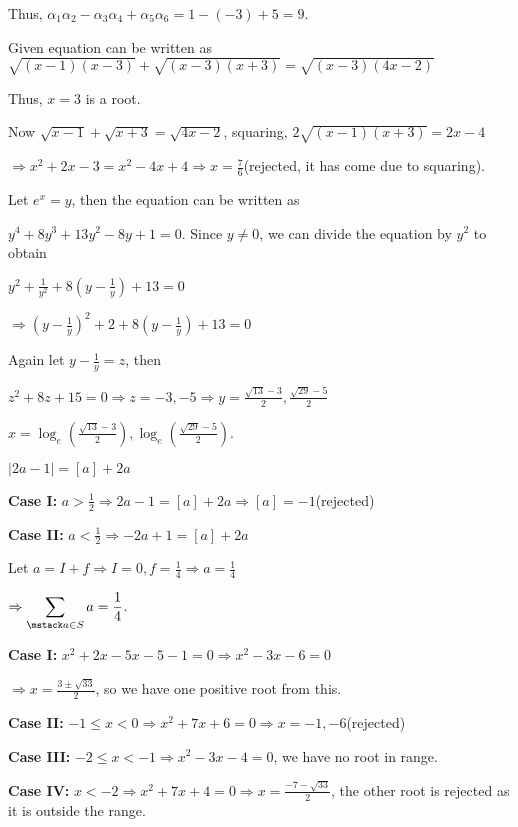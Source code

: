   Thus, $\alpha_1\alpha_2 - \alpha_3\alpha_4 + \alpha_5\alpha_6 = 1 - (-3) + 5 = 9$.
\item Given equation can be written as $\sqrt{(x - 1)(x - 3)} + \sqrt{(x - 3)(x + 3)} = \sqrt{(x - 3)(4x -
  2)}$

  Thus, $x = 3$ is a root.

  Now $\sqrt{x - 1} + \sqrt{x + 3} = \sqrt{4x - 2}$, squaring, $2\sqrt{(x - 1)(x + 3)} = 2x - 4$

  $\Rightarrow x^2 + 2x - 3 = x^2 - 4x + 4 \Rightarrow x = \frac{7}{6}$(rejected, it has come due to
  squaring).
\item Let $e^x = y$, then the equation can be written as

  $y^4 + 8y^3 + 13y^2 - 8y + 1 = 0$. Since $y\neq 0$, we can divide the equation by $y^2$ to obtain

  $y^2 + \frac{1}{y^2} + 8\left(y - \frac{1}{y}\right) + 13 = 0$

  $\Rightarrow \left(y - \frac{1}{y}\right)^2 + 2 + 8\left(y - \frac{1}{y}\right) + 13 = 0$

  Again let $y - \frac{1}{y} = z$, then

  $z^2 + 8z + 15 = 0 \Rightarrow z = -3, -5\Rightarrow y = \frac{\sqrt{13} - 3}{2}, \frac{\sqrt{29} - 5}{2}$

  $x = \log_e\left(\frac{\sqrt{13} - 3}{2}\right), \log_e\left(\frac{\sqrt{29} - 5}{2}\right)$.
\item $|2a - 1| = [a] + 2a$

  {\bf Case I:} $a > \frac{1}{2}\Rightarrow 2a - 1 = [a] + 2a \Rightarrow [a] = -1$(rejected)

  {\bf Case II:} $a < \frac{1}{2}\Rightarrow -2a + 1 = [a] + 2a$

  Let $a = I + f\Rightarrow I= 0, f= \frac{1}{4}\Rightarrow a = \frac{1}{4}$

  $\Rightarrow \displaystyle\sum_{\mstack a\in S}a = \frac{1}{4}$.
\item {\bf Case I:} $x^2 + 2x - 5x - 5 - 1= 0 \Rightarrow x^2 - 3x - 6 = 0$

  $\Rightarrow x = \frac{3\pm\sqrt{33}}{2}$, so we have one positive root from this.

  {\bf Case II:} $-1\leq x < 0\Rightarrow x^2 + 7x + 6 = 0 \Rightarrow x = -1, -6$(rejected)

  {\bf Case III:} $-2\leq x < -1\Rightarrow x^2 - 3x - 4 = 0$, we have no root in range.

  {\bf Case IV:} $x < -2\Rightarrow x^2 + 7x + 4 = 0 \Rightarrow x = \frac{-7 - \sqrt{33}}{2}$, the other
  root is rejected as it is outside the range.

